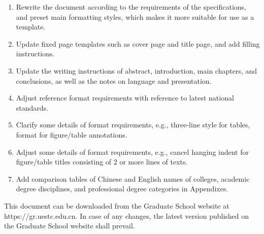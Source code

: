 \begin{abstract*}
  \begin{enumerate}
    \item Rewrite the document according to the requirements of the specifications, and preset main formatting styles, which makes it more suitable for use as a template.
    \item Update fixed page templates such as cover page and title page, and add filling instructions.
    \item Update the writing instructions of abstract, introduction, main chapters, and conclusions, as well as the notes on language and presentation.
    \item Adjust reference format requirements with reference to latest national standards.
    \item Clarify some details of format requirements, e.g., three-line style for tables, format for figure/table annotations.
    \item Adjust some details of format requirements, e.g., cancel hanging indent for figure/table titles consisting of 2 or more lines of texts.
    \item Add comparison tables of Chinese and English names of colleges, academic degree disciplines, and professional degree categories in Appendixes.
  \end{enumerate}

  This document can be downloaded from the Graduate School website at https://gr.uestc.edu.cn. In case of any changes, the latest version published on the Graduate School website shall prevail.

\end{abstract*}
